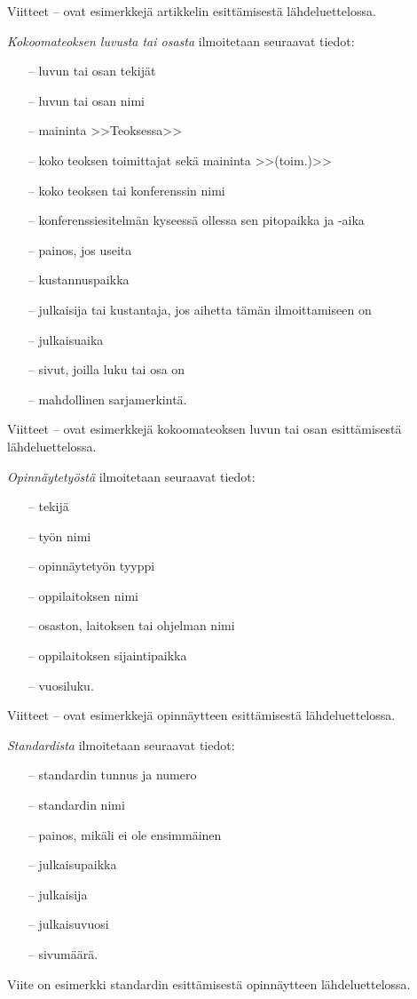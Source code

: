 \documentclass[english,12pt,a4paper,pdftex,elec,utf8]{aaltothesis}
\begin{document}
Viitteet \cite{bcs}--\cite{Deschamps} ovat esimerkkej\"a artikkelin
esitt\"amisest\"a l\"ahdeluettelossa.

\textit{Kokoomateoksen luvusta tai osasta} ilmoitetaan seuraavat tiedot:

\begin{itemize}
\item[--]luvun tai osan tekij\"at
\item[--]luvun tai osan nimi
\item[--]maininta >>Teoksessa>>
\item[--]koko teoksen toimittajat sek\"a maininta >>(toim.)>>
\item[--]koko teoksen tai konferenssin nimi
\item[--]konferenssiesitelm\"an kyseess\"a ollessa sen pitopaikka ja -aika
\item[--]painos, jos useita
\item[--]kustannuspaikka
\item[--]julkaisija tai kustantaja, jos aihetta t\"am\"an ilmoittamiseen on
\item[--]julkaisuaika
\item[--]sivut, joilla luku tai osa on
\item[--]mahdollinen sarjamerkint\"a.
\end{itemize}

Viitteet \cite{Sihvola}--\cite{Lindblom} ovat esimerkkej\"a
kokoomateoksen luvun tai osan esitt\"amisest\"a l\"ahdeluettelossa.

\textit{Opinn\"aytety\"ost\"a} ilmoitetaan seuraavat tiedot:

\begin{itemize}
\item[--]tekij\"a
\item[--]ty\"on nimi
\item[--]opinn\"aytety\"on tyyppi
\item[--]oppilaitoksen nimi
\item[--]osaston, laitoksen tai ohjelman nimi
\item[--]oppilaitoksen sijaintipaikka
\item[--]vuosiluku.
\end{itemize}

Viitteet \cite{Miinusmaa}--\cite{Lonnqvist} ovat esimerkkej\"a
opinn\"aytteen esitt\"amisest\"a l\"ahdeluettelossa.

\textit{Standardista} ilmoitetaan seuraavat tiedot:

\begin{itemize}
\item[--]standardin tunnus ja numero
\item[--]standardin nimi
\item[--]painos, mik\"ali ei ole ensimm\"ainen
\item[--]julkaisupaikka
\item[--]julkaisija
\item[--]julkaisuvuosi
\item[--]sivum\"a\"ar\"a.
\end{itemize}
Viite \cite{sfs} on esimerkki standardin esitt\"amisest\"a opinn\"aytteen
l\"ahdeluettelossa.
\end{document}

